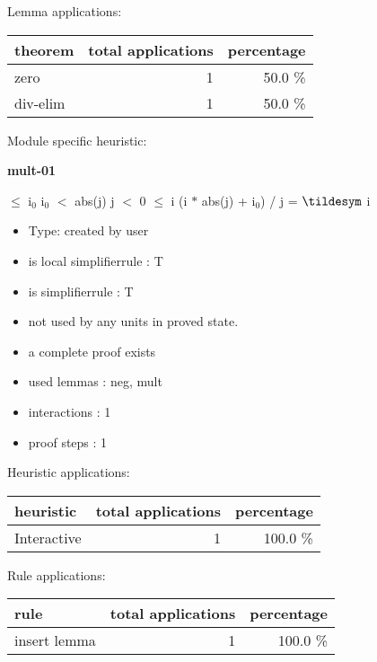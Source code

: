 \documentclass[a4paper]{article}
\begin{document}
Lemma applications:

\begin{supertabular}{l|r|r}
theorem	        & total applications & percentage \\ \hline
zero & 1 & 50.0 \% \\
div-elim & 1 & 50.0 \% \\

\end{supertabular}

Module specific heuristic:

\pagebreak

{\LARGE\bf mult-01}\label{lemma-mult-01}

\medskip

  $\le$ $\mbox{i}_{0}$ \And $\mbox{i}_{0}$ $<$ abs(j) \And j $<$ 0  $\le$ i \Imp (i $*$ abs(j) + $\mbox{i}_{0}$) / j = $\tildesym$ i

\begin{itemize}

\item Type: created by user

\item is local simplifierrule : T
\item is simplifierrule : T
\item not used by any units in proved state.
\item       a complete proof exists
\item       used lemmas  : neg, mult
\item       interactions : 1
\item       proof steps  : 1
\end{itemize}

\medskip


Heuristic applications:

\begin{supertabular}{l|r|r}
heuristic	& total applications & percentage \\ \hline
Interactive & 1 & 100.0 \% \\

\end{supertabular}

Rule applications:

\begin{supertabular}{l|r|r}
rule	        & total applications & percentage \\ \hline
insert lemma & 1 & 100.0 \% \\

\end{supertabular}
\end{document}
